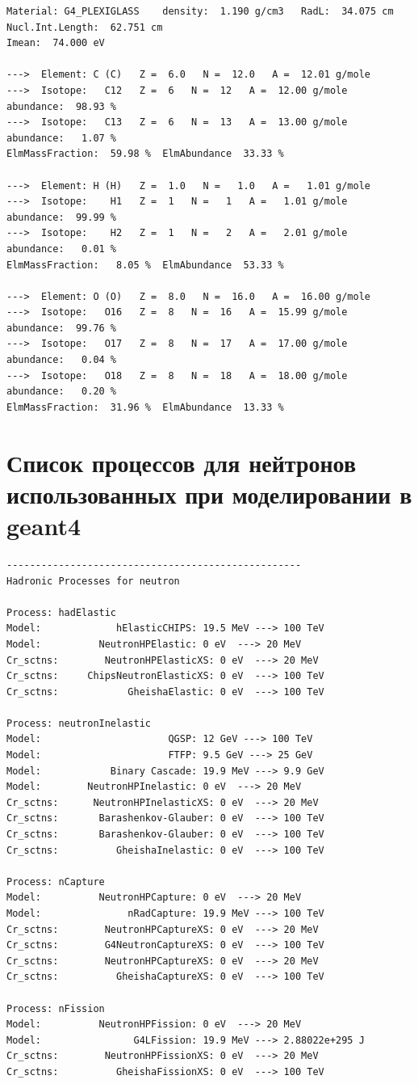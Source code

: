 {\begin{verbatim}
Material: G4_PLEXIGLASS    density:  1.190 g/cm3   RadL:  34.075 cm   Nucl.Int.Length:  62.751 cm 
Imean:  74.000 eV 

--->  Element: C (C)   Z =  6.0   N =  12.0   A =  12.01 g/mole
--->  Isotope:   C12   Z =  6   N =  12   A =  12.00 g/mole   abundance:  98.93 %
--->  Isotope:   C13   Z =  6   N =  13   A =  13.00 g/mole   abundance:   1.07 %
ElmMassFraction:  59.98 %  ElmAbundance  33.33 % 

--->  Element: H (H)   Z =  1.0   N =   1.0   A =   1.01 g/mole
--->  Isotope:    H1   Z =  1   N =   1   A =   1.01 g/mole   abundance:  99.99 %
--->  Isotope:    H2   Z =  1   N =   2   A =   2.01 g/mole   abundance:   0.01 %
ElmMassFraction:   8.05 %  ElmAbundance  53.33 % 

--->  Element: O (O)   Z =  8.0   N =  16.0   A =  16.00 g/mole
--->  Isotope:   O16   Z =  8   N =  16   A =  15.99 g/mole   abundance:  99.76 %
--->  Isotope:   O17   Z =  8   N =  17   A =  17.00 g/mole   abundance:   0.04 %
--->  Isotope:   O18   Z =  8   N =  18   A =  18.00 g/mole   abundance:   0.20 %
ElmMassFraction:  31.96 %  ElmAbundance  13.33 % 
\end{verbatim}
}
\section{Список процессов для нейтронов использованных при моделировании в geant4}

\label{list:geantNeuproc}
\tiny{
	\begin{verbatim}
---------------------------------------------------
Hadronic Processes for neutron

Process: hadElastic
Model:             hElasticCHIPS: 19.5 MeV ---> 100 TeV
Model:          NeutronHPElastic: 0 eV  ---> 20 MeV
Cr_sctns:        NeutronHPElasticXS: 0 eV  ---> 20 MeV
Cr_sctns:     ChipsNeutronElasticXS: 0 eV  ---> 100 TeV
Cr_sctns:            GheishaElastic: 0 eV  ---> 100 TeV

Process: neutronInelastic
Model:                      QGSP: 12 GeV ---> 100 TeV
Model:                      FTFP: 9.5 GeV ---> 25 GeV
Model:            Binary Cascade: 19.9 MeV ---> 9.9 GeV
Model:        NeutronHPInelastic: 0 eV  ---> 20 MeV
Cr_sctns:      NeutronHPInelasticXS: 0 eV  ---> 20 MeV
Cr_sctns:       Barashenkov-Glauber: 0 eV  ---> 100 TeV
Cr_sctns:       Barashenkov-Glauber: 0 eV  ---> 100 TeV
Cr_sctns:          GheishaInelastic: 0 eV  ---> 100 TeV

Process: nCapture
Model:          NeutronHPCapture: 0 eV  ---> 20 MeV
Model:               nRadCapture: 19.9 MeV ---> 100 TeV
Cr_sctns:        NeutronHPCaptureXS: 0 eV  ---> 20 MeV
Cr_sctns:        G4NeutronCaptureXS: 0 eV  ---> 100 TeV
Cr_sctns:        NeutronHPCaptureXS: 0 eV  ---> 20 MeV
Cr_sctns:          GheishaCaptureXS: 0 eV  ---> 100 TeV

Process: nFission
Model:          NeutronHPFission: 0 eV  ---> 20 MeV
Model:                G4LFission: 19.9 MeV ---> 2.88022e+295 J  
Cr_sctns:        NeutronHPFissionXS: 0 eV  ---> 20 MeV
Cr_sctns:          GheishaFissionXS: 0 eV  ---> 100 TeV
\end{verbatim}
}



